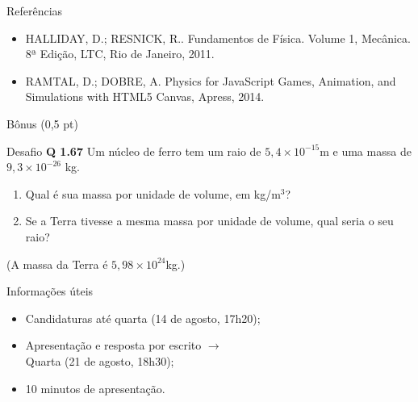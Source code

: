 \documentclass[xcolor=dvipsnames,table]{beamer}
\begin{document}
	\begin{frame}{Referências}
		\begin{itemize}
			\item HALLIDAY, D.; RESNICK, R.. Fundamentos de Física. Volume 1, Mecânica. 8ª Edição, LTC, Rio de Janeiro, 2011.
			
			\item RAMTAL, D.; DOBRE, A. Physics for JavaScript Games, Animation, and Simulations with HTML5 Canvas, Apress, 2014.
		\end{itemize}
	\end{frame}
	
	\begin{frame}{Bônus (0,5 pt)}
		\begin{block}{Desafio}
			{\bf Q 1.67} Um núcleo de ferro tem um raio de $5,4 \times 10^{-15}$m e uma massa de $9,3 \times 10^{-26}$ kg.
			\begin{enumerate}
				\item Qual é sua massa por unidade de volume, em kg/m$^3$?
				\item Se a Terra tivesse a mesma massa por unidade de volume, qual seria o seu raio?
			\end{enumerate}
			(A massa da Terra é $5,98 \times 10^{24}$kg.) 
		\end{block} \pause
		\begin{block}{Informações úteis}
			\begin{itemize}
                \item Candidaturas até quarta (14 de agosto, 17h20);
                \item Apresentação e resposta por escrito $\rightarrow$ \\Quarta (21 de agosto, 18h30);
                \item 10 minutos de apresentação.
			\end{itemize}
		\end{block} 
	\end{frame}
	
	\begin{frame}
		\titlepage
	\end{frame}
	
\end{document}
